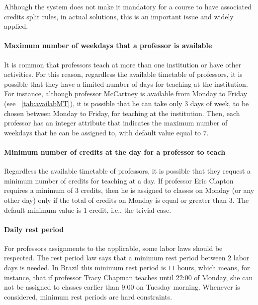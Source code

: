 Although the system does not make it mandatory for a course to have associated credits split rules, in actual solutions, this is an important issue and widely applied.


\paragraph{Maximum number of weekdays that a professor is available}
\label{constrmaxdaysprof}

It is common that professors teach at more than one institution or have other activities. For this reason, regardless the available timetable of professors, it is possible that they have a limited number of days for teaching at the institution. For instance, although professor McCartney is available from Monday to Friday (see ~\ref{tab:availabMT}), it is possible that he can take only $3$ days of week, to be chosen between Monday to Friday, for teaching at the institution. Then, each professor has an integer attribute that indicates the maximum number of weekdays that he can be assigned to, with default value equal to $7$.


\paragraph{Minimum number of credits at the day for a professor to teach}
\label{constrmincredsdayprof}

Regardless the available timetable of professors, it is possible that they request a minimum number of credits for teaching at a day. If professor Eric Clapton requires a minimum of $3$ credits, then he is assigned to classes on Monday (or any other day) only if the total of credits on Monday is equal or greater than $3$. The default minimum value is $1$ credit, i.e., the trivial case.


\paragraph{Daily rest period}
\label{constrrestperiod}

For professors assignments to the applicable, some labor laws should be respected. The rest period law says that a minimum rest period between $2$ labor days is needed. In Brazil this minimum rest period is $11$ hours, which means, for instance, that if professor Tracy Chapman teaches until 22:00 of Monday, she can not be assigned to classes earlier than 9:00 on Tuesday morning. Whenever is considered, minimum rest periods are hard constraints.



